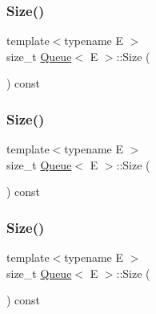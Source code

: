 \mbox{\label{class_queue_abc4d78b5f66041011c5590bf703847b0}} 
\subsubsection{\texorpdfstring{Size()}{Size()}\hspace{0.1cm}{\footnotesize\ttfamily [1/3]}}
{\footnotesize\ttfamily template$<$typename E $>$ \\
size\+\_\+t \mbox{\hyperlink{class_queue}{Queue}}$<$ E $>$\+::Size (\begin{DoxyParamCaption}{ }\end{DoxyParamCaption}) const\hspace{0.3cm}{\ttfamily [inline]}}

\mbox{\label{class_queue_abc4d78b5f66041011c5590bf703847b0}} 
\subsubsection{\texorpdfstring{Size()}{Size()}\hspace{0.1cm}{\footnotesize\ttfamily [2/3]}}
{\footnotesize\ttfamily template$<$typename E $>$ \\
size\+\_\+t \mbox{\hyperlink{class_queue}{Queue}}$<$ E $>$\+::Size (\begin{DoxyParamCaption}{ }\end{DoxyParamCaption}) const\hspace{0.3cm}{\ttfamily [inline]}}

\mbox{\label{class_queue_abc4d78b5f66041011c5590bf703847b0}} 
\subsubsection{\texorpdfstring{Size()}{Size()}\hspace{0.1cm}{\footnotesize\ttfamily [3/3]}}
{\footnotesize\ttfamily template$<$typename E $>$ \\
size\+\_\+t \mbox{\hyperlink{class_queue}{Queue}}$<$ E $>$\+::Size (\begin{DoxyParamCaption}{ }\end{DoxyParamCaption}) const\hspace{0.3cm}{\ttfamily [inline]}}



